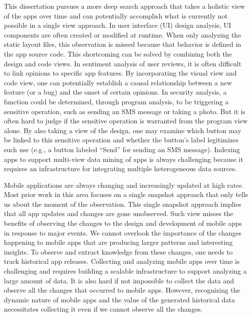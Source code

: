 This dissertation pursues a more deep search approach that takes a holistic view of the apps over time and can potentially accomplish what is currently not possible in a single view approach.
In user interface (UI) design analysis, UI components are often created or modified at runtime.
When only analyzing the static layout files, this observation is missed because that behavior is defined in the app source code.
This shortcoming can be solved by combining both the design and code views.
In sentiment analysis of user reviews, it is often difficult to link opinions to specific app features.
By incorporating the visual view and code view, one can potentially establish a causal relationship between a new feature (or a bug) and the onset of certain opinions.
In security analysis, a function could be determined, through program analysis, to be triggering a sensitive operation, such as sending an SMS message or taking a photo.
But it is often hard to judge if the sensitive operation is warranted from the program view alone.
By also taking a view of the design, one may examine which button may be linked to this sensitive operation and whether the button's label legitimizes such use (e.g., a button labeled ``Send'' for sending an SMS message).
Indexing apps to support multi-view data mining of apps is always challenging because it requires an infrastructure for integrating multiple heterogeneous data sources.

Mobile applications are always changing and increasingly updated at high rates.
Most prior work in this area focuses on a single snapshot approach that only tells us about the moment of the observation.
This single snapshot approach implies that all app updates and changes are gone unobserved.
Such view misses the benefits of observing the changes to the design and development of mobile apps in response to major events.
We cannot overlook the importance of the changes happening to mobile apps that are producing larger patterns and interesting insights.
To observe and extract knowledge from these changes, one needs to track historical app releases.
Collecting and analyzing mobile apps over time is challenging and requires building a scalable infrastructure to support analyzing a large amount of data.
It is also hard if not impossible to collect the data and observe all the changes that occurred to mobile apps.
However, recognizing the dynamic nature of mobile apps and the value of the generated historical data necessitates collecting it even if we cannot observe all the changes.

